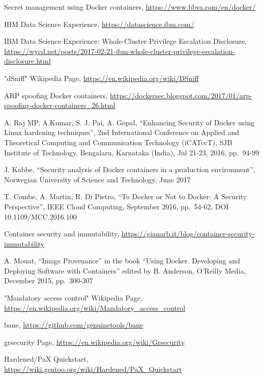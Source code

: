 \documentclass[a4paper,12pt]{article}
\begin{document}
\begin{thebibliography}{99}
Secret management using Docker containers, \url{https://www.bbva.com/en/docker/}

IBM Data Science Experience, \url{https://datascience.ibm.com/}

IBM Data Science Experience: Whole-Cluster Privilege Escalation Disclosure,
\url{https://wycd.net/posts/2017-02-21-ibm-whole-cluster-privilege-escalation-disclosure.html}

"dSniff" Wikipedia Page, \url{https://en.wikipedia.org/wiki/DSniff}

ARP spoofing Docker containers,
\url{https://dockersec.blogspot.com/2017/01/arp-spoofing-docker-containers_26.html}

A. Raj MP, A.Kumar, S. J. Pai, A. Gopal, 
``Enhancing Security of Docker using Linux hardening techniques'',
2nd International Conference on Applied and Theoretical Computing and
Communication Technology (iCATccT),
SJB Institute of Technology, Bengalaru, Karnataka (India), Jul 21-23, 2016,
pp.\ 94-99

J. Kabbe, 
``Security analysis of Docker containers in a production environment'', 
Norwegian University of Science and Technology, 
June 2017

T. Combe, A. Martin, R. Di Pietro, 
``To Docker or Not to Docker: A Security Perspective'', 
IEEE Cloud Computing,
September 2016,
pp.\ 54-62,
DOI 10.1109/MCC.2016.100

Container security and immutability,
\url{https://gianarb.it/blog/container-security-immutability}

A. Mouat, 
``Image Provenance''
in the book
``Using Docker. Developing and Deploying Software with Containers''
edited by
B. Anderson,
O'Reilly Media, 
December 2015,
pp.\ 300-307

"Mandatory access control" Wikipedia Page,
\url{https://en.wikipedia.org/wiki/Mandatory_access_control}

bane, \url{https://github.com/genuinetools/bane}

grsecurity Page, \url{https://en.wikipedia.org/wiki/Grsecurity}


Hardened/PaX Quickstart,
\url{https://wiki.gentoo.org/wiki/Hardened/PaX_Quickstart}


\end{thebibliography}
\end{document}
